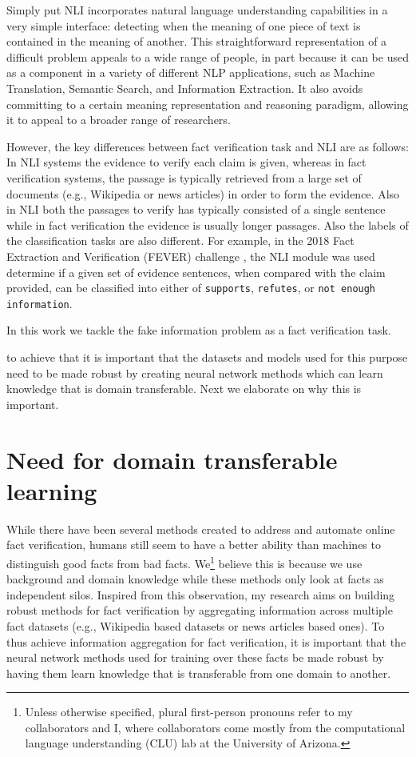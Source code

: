 Simply put NLI incorporates natural language understanding capabilities in a very simple interface: detecting when the meaning of one piece of text is contained in the meaning of another. This straightforward representation of a difficult problem appeals to a wide range of people, in part because it can be used as a component in a variety of different NLP applications, such as Machine Translation, Semantic Search, and Information Extraction. It also avoids committing to a certain meaning representation and reasoning paradigm, allowing it to appeal to a broader range of researchers.


However, the key differences between fact verification task and NLI are as follows: In NLI systems the evidence to verify each claim is given, whereas in fact verification systems, the passage is typically retrieved from a large set of documents (e.g., Wikipedia or news articles) in order to form the evidence. Also in NLI both the passages to verify has typically consisted of a single sentence while in fact verification the evidence is usually longer passages. Also the labels of the classification tasks are also different. For example, in the 2018 Fact Extraction and Verification (FEVER) challenge \citep{thorne2018fever}, the NLI module was used determine if a given set of evidence sentences, when compared with the claim provided, can be classified into either of \texttt{supports}, \texttt{refutes}, or \texttt{not enough information}. 

In this work we tackle the fake information problem as a fact verification task.  


to achieve that it is important that the datasets and models used for this purpose need to be made robust by creating neural network methods which can learn knowledge that is domain transferable. Next we elaborate on why this is important.
 
 \section{Need for domain transferable learning}
 
 
 
While there have been several methods created to address and automate online fact verification, humans still seem to have a better ability than machines to distinguish good facts from bad facts. We\footnote{Unless otherwise specified, plural first-person pronouns refer to my collaborators and I, where collaborators come mostly from the computational language understanding (CLU) lab at the University of Arizona.}  believe this is because we use background and domain knowledge while these methods only look at facts as independent silos. Inspired from this observation, my research aims on building robust methods for fact verification by aggregating information across multiple fact datasets (e.g., Wikipedia based datasets or news articles based ones). To thus achieve information aggregation for fact verification, it is important that the neural network methods used for training over these facts be made robust by having them learn knowledge that is transferable from one domain to another.


